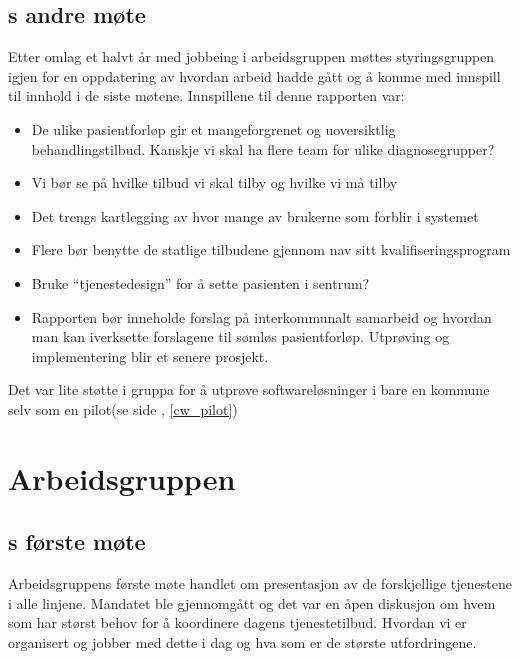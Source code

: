 \documentclass[11pt]{report} %
\begin{document}
                  \subsection{s andre møte}\label{sec:stygr_2}
                    Etter omlag et halvt år med jobbeing i arbeidsgruppen møttes styringsgruppen igjen \cite{strgr_mref13-2} for en oppdatering av hvordan arbeid hadde gått og å komme med innspill til innhold i de siste møtene. Innspillene til denne rapporten var:
                    \begin{itemize}
                    \item De ulike pasientforløp gir et mangeforgrenet og uoversiktlig behandlingstilbud. Kanskje vi skal ha flere team for ulike diagnosegrupper?\\
                    \item Vi bør se på hvilke tilbud vi skal tilby og hvilke vi må tilby\\
                    \item Det trengs kartlegging av hvor mange av brukerne som forblir i systemet\\
                    \item Flere bør benytte de statlige tilbudene gjennom nav sitt kvalifiseringsprogram\\
                    \item Bruke “tjenestedesign” for å sette pasienten i sentrum?\\
                    \item Rapporten bør inneholde forslag på interkommunalt samarbeid og hvordan man kan iverksette forslagene til sømløs pasientforløp. Utprøving og implementering blir et senere prosjekt.\\
                    \end{itemize}
                    Det var lite støtte i gruppa for å utprøve softwareløsninger i bare en kommune selv som en pilot(se side \pageref{cw_pilot}, \ref{cw_pilot})
                \section{Arbeidsgruppen}\label{sec:m_agr}
                  \subsection{s første møte}\label{sec:agr_1}
                    Arbeidsgruppens første møte\cite{arbgr_mref-1} handlet om presentasjon av de forskjellige tjenestene i alle linjene. Mandatet ble gjennomgått og det var en åpen diskusjon om hvem som har størst behov for å koordinere dagens tjenestetilbud. Hvordan vi er organisert og jobber med dette i dag og hva som er de største utfordringene. \\
\end{document}
